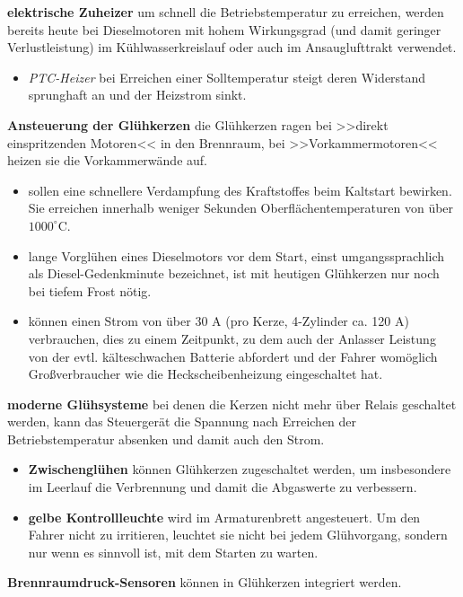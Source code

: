 \textbf{elektrische Zuheizer} um schnell die Betriebstemperatur zu
erreichen, werden bereits heute bei Dieselmotoren mit hohem Wirkungsgrad
(und damit geringer Verlustleistung) im Kühlwasserkreislauf oder auch im
Ansauglufttrakt verwendet.

\begin{itemize}
\item
  \emph{PTC-Heizer} bei Erreichen einer Solltemperatur steigt deren
  Widerstand sprunghaft an und der Heizstrom sinkt.
\end{itemize}

\textbf{Ansteuerung der Glühkerzen} die Glühkerzen ragen bei >>direkt
einspritzenden Motoren<< in den Brennraum, bei >>Vorkammermotoren<<
heizen sie die Vorkammerwände auf.

\begin{itemize}
\item
  sollen eine schnellere Verdampfung des Kraftstoffes beim Kaltstart
  bewirken. Sie erreichen innerhalb weniger Sekunden
  Oberflächentemperaturen von über $1000^\circ \text{C}$.
\item
  lange Vorglühen eines Dieselmotors vor dem Start, einst
  umgangssprachlich als Diesel-Gedenkminute bezeichnet, ist mit heutigen
  Glühkerzen nur noch bei tiefem Frost nötig.
\item
  können einen Strom von über 30 A (pro Kerze, 4-Zylinder ca. 120 A)
  verbrauchen, dies zu einem Zeitpunkt, zu dem auch der Anlasser
  Leistung von der evtl. kälteschwachen Batterie abfordert und der
  Fahrer womöglich Großverbraucher wie die Heckscheibenheizung
  eingeschaltet hat.
\end{itemize}

\textbf{moderne Glühsysteme} bei denen die Kerzen nicht mehr über Relais
geschaltet werden, kann das Steuergerät die Spannung nach Erreichen der
Betriebstemperatur absenken und damit auch den Strom.

\begin{itemize}
\item
  \textbf{Zwischenglühen} können Glühkerzen zugeschaltet werden, um
  insbesondere im Leerlauf die Verbrennung und damit die Abgaswerte zu
  verbessern.
\item
  \textbf{gelbe Kontrollleuchte} wird im Armaturenbrett angesteuert. Um
  den Fahrer nicht zu irritieren, leuchtet sie nicht bei jedem
  Glühvorgang, sondern nur wenn es sinnvoll ist, mit dem Starten zu
  warten.
\end{itemize}

\textbf{Brennraumdruck-Sensoren} können in Glühkerzen integriert werden.
